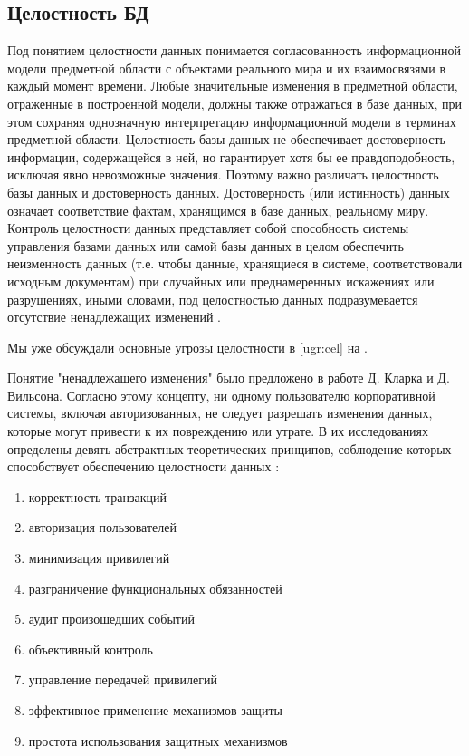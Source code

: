 \subsection{Целостность БД}
Под понятием целостности данных понимается согласованность информационной модели предметной области с объектами реального мира и их взаимосвязями в каждый момент времени. Любые значительные изменения в предметной области, отраженные в построенной модели, должны также отражаться в базе данных, при этом сохраняя однозначную интерпретацию информационной модели в терминах предметной области. Целостность базы данных не обеспечивает достоверность информации, содержащейся в ней, но гарантирует хотя бы ее правдоподобность, исключая явно невозможные значения. Поэтому важно различать целостность базы данных и достоверность данных. Достоверность (или истинность) данных означает соответствие фактам, хранящимся в базе данных, реальному миру. Контроль целостности данных представляет собой способность системы управления базами данных или самой базы данных в целом обеспечить неизменность данных (т.е. чтобы данные, хранящиеся в системе, соответствовали исходным документам) при случайных или преднамеренных искажениях или разрушениях, иными словами, под целостностью данных подразумевается отсутствие ненадлежащих изменений \autocite[с. 18]{Skakun}.

Мы уже обсуждали основные угрозы целостности в \ref{ugr:cel} на \pageref{ugr:cel}.

Понятие "ненадлежащего изменения" было предложено в работе Д. Кларка и Д. Вильсона. Согласно этому концепту, ни одному пользователю корпоративной системы, включая авторизованных, не следует разрешать изменения данных, которые могут привести к их повреждению или утрате. В их исследованиях определены девять абстрактных теоретических принципов, соблюдение которых способствует обеспечению целостности данных \autocite[сс. 58-59]{Skakun}:

\begin{enumerate}
	\item корректность транзакций
	\item авторизация пользователей
	\item минимизация привилегий
	\item разграничение функциональных обязанностей
	\item аудит произошедших событий
	\item объективный контроль
	\item управление передачей привилегий
	\item эффективное применение механизмов защиты
	\item простота использования защитных механизмов
\end{enumerate}

